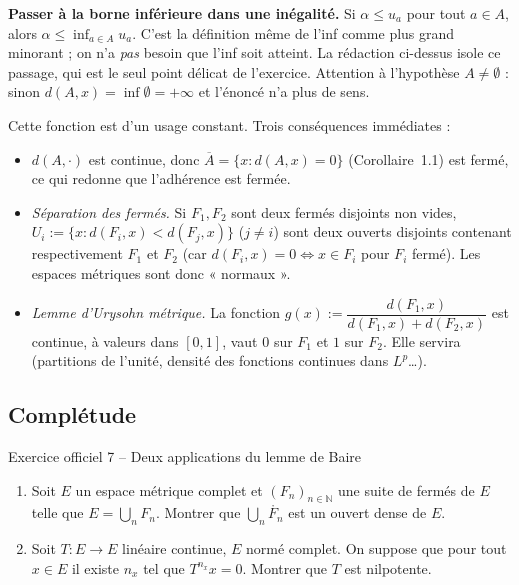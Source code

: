 \documentclass[11pt,a4paper]{article}
\newcommand{\N}{\mathbb{N}}
\newcommand{\interieur}[1]{\mathring{#1}}
\newcommand{\adh}[1]{\overline{#1}}
\theoremstyle{definition}
\begin{document}
\begin{pointcle}
\textbf{Passer à la borne inférieure dans une inégalité.} Si $\alpha\le u_a$ pour tout $a\in A$, alors $\alpha\le\inf_{a\in A}u_a$. C'est la définition même de l'inf comme plus grand minorant ; on n'a \emph{pas} besoin que l'inf soit atteint. La rédaction ci-dessus isole ce passage, qui est le seul point délicat de l'exercice. Attention à l'hypothèse $A\ne\emptyset$ : sinon $d(A,x)=\inf\emptyset=+\infty$ et l'énoncé n'a plus de sens.
\end{pointcle}

\begin{commentaire}
Cette fonction est d'un usage constant. Trois conséquences immédiates :
\begin{itemize}
  \item $d(A,\cdot)$ est continue, donc $\adh{A}=\{x : d(A,x)=0\}$ (Corollaire~1.1) est fermé, ce qui redonne que l'adhérence est fermée.
  \item \emph{Séparation des fermés.} Si $F_1,F_2$ sont deux fermés disjoints non vides, $U_i:=\{x : d(F_i,x)<d(F_j,x)\}$ ($j\ne i$) sont deux ouverts disjoints contenant respectivement $F_1$ et $F_2$ (car $d(F_i,x)=0\iff x\in F_i$ pour $F_i$ fermé). Les espaces métriques sont donc « normaux ».
  \item \emph{Lemme d'Urysohn métrique.} La fonction $g(x):=\dfrac{d(F_1,x)}{d(F_1,x)+d(F_2,x)}$ est continue, à valeurs dans $[0,1]$, vaut $0$ sur $F_1$ et $1$ sur $F_2$. Elle servira (partitions de l'unité, densité des fonctions continues dans $L^p$…).
\end{itemize}
\end{commentaire}

\subsection*{Complétude}

\begin{exo}{Exercice officiel 7 -- Deux applications du lemme de Baire}
\begin{enumerate}[label=\arabic*.]
  \item Soit $E$ un espace métrique complet et $(F_n)_{n\in\N}$ une suite de fermés de $E$ telle que $E=\bigcup_{n}F_n$. Montrer que $\bigcup_n\interieur{F_n}$ est un ouvert dense de $E$.
  \item Soit $T:E\to E$ linéaire continue, $E$ normé complet. On suppose que pour tout $x\in E$ il existe $n_x$ tel que $T^{n_x}x=0$. Montrer que $T$ est nilpotente.
\end{enumerate}
\end{exo}
\end{document}
